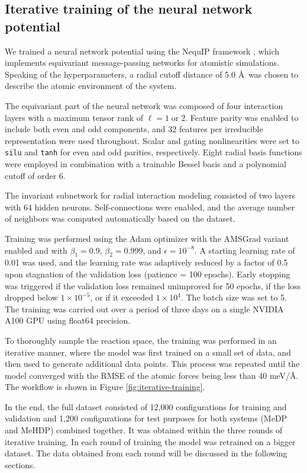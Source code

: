 \subsection{Iterative training of the neural network potential} \label{subsec:iterative-training-of-the-neural-network-potential}
We trained a neural network potential using the NequIP framework \citep{batznerE3equivariantGraphNeural2022}, which implements equivariant message-passing networks for atomistic simulations. Speaking of the hyperparameters, a radial cutoff distance of 5.0 \AA\ was chosen to describe the atomic environment of the system.

The equivariant part of the neural network was composed of four interaction layers with a maximum tensor rank of $\ell = 1 \; \text{or} \; 2$. Feature parity was enabled to include both even and odd components, and 32 features per irreducible representation were used throughout. Scalar and gating nonlinearities were set to \texttt{silu} and \texttt{tanh} for even and odd parities, respectively. Eight radial basis functions were employed in combination with a trainable Bessel basis and a polynomial cutoff of order 6.

The invariant subnetwork for radial interaction modeling consisted of two layers with 64 hidden neurons. Self-connections were enabled, and the average number of neighbors was computed automatically based on the dataset.

Training was performed using the Adam optimizer with the AMSGrad variant enabled and with $\beta_1 = 0.9$, $\beta_2 = 0.999$, and $\epsilon = 10^{-8}$. A starting learning rate of 0.01 was used, and the learning rate was adaptively reduced by a factor of 0.5 upon stagnation of the validation loss (patience = 100 epochs). Early stopping was triggered if the validation loss remained unimproved for 50 epochs, if the loss dropped below $1 \times 10^{-5}$, or if it exceeded $1 \times 10^{4}$. The batch size was set to 5. The training was carried out over a period of three days on a single NVIDIA A100 GPU using float64 precision.

To thoroughly sample the reaction space, the training was performed in an iterative manner, where the model was first trained on a small set of data, and then used to generate additional data points. This process was repeated until the model converged with the RMSE of the atomic forces being less than 40 meV/\AA. The workflow is shown in Figure \ref{fig:iterative-training}.

In the end, the full dataset consisted of 12,000 configurations for training and validation and 1,200 configurations for test purposes for both systems (MeDP and MeHDP) combined together. It was obtained within the three rounds of iterative training. In each round of training the model was retrained on a bigger dataset. The data obtained from each round will be discussed in the following sections.

